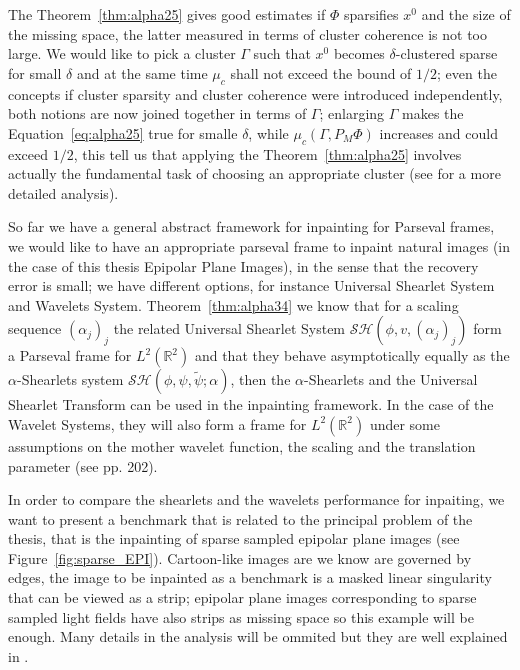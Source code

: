 \bigskip

The Theorem~\ref{thm:alpha25} gives good estimates if $\Phi$ sparsifies $x^0$ and the size of the missing space, the latter measured in terms of cluster coherence is not too large. We would like to pick a cluster $\Gamma$ such that $x^0$ becomes $\delta$-clustered sparse for small $\delta$ and at the same time $\mu_c$ shall not exceed the bound of $1/2$; even the concepts if cluster sparsity and cluster coherence were introduced independently, both notions are now joined together in terms of $\Gamma$; enlarging $\Gamma$ makes the Equation~\ref{eq:alpha25} true for smalle $\delta$, while $\mu_c(\Gamma,P_M\Phi)$ increases and could exceed $1/2$, this tell us that applying the Theorem~\ref{thm:alpha25} involves actually the fundamental task of choosing an appropriate cluster (see \cite{Firstinpaint} for a more detailed analysis). 

\bigskip

So far we have a general abstract framework for inpainting for Parseval frames, we would like to have an appropriate parseval frame to inpaint natural images (in the case of this thesis Epipolar Plane Images), in the sense that the recovery error is small; we have different options, for instance Universal Shearlet System and Wavelets System. Theorem~\ref{thm:alpha34} we know that for a scaling sequence $(\alpha_j)_j$ the related Universal Shearlet System $\mathcal{SH}(\phi,v,(\alpha_j)_j)$ form a Parseval frame for $L^2(\mathbb{R}^2)$ and that they behave asymptotically equally as the $\alpha$-Shearlets system $\mathcal{SH}(\phi,\psi,\tilde{\psi};\alpha)$, then the $\alpha$-Shearlets and the Universal Shearlet Transform can be used in the inpainting framework. In the case of the Wavelet Systems, they will also form a frame for $L^2(\mathbb{R}^2)$ under some assumptions on the mother wavelet function, the scaling and the translation parameter (see \cite{Mallat} pp. 202).

\bigskip

In order to compare the shearlets and the wavelets performance for inpaiting, we want to present a benchmark that is related to the principal problem of the thesis, that is the inpainting of sparse sampled epipolar plane images (see Figure~\ref{fig:sparse_EPI}). Cartoon-like images are we know are governed by edges, the image to be inpainted as a benchmark is a masked linear singularity that can be viewed as a strip; epipolar plane images corresponding to sparse sampled light fields have also strips as missing space so this example will be enough. Many details in the analysis will be ommited but they are well explained in \cite{Gitta-alpha}. 

